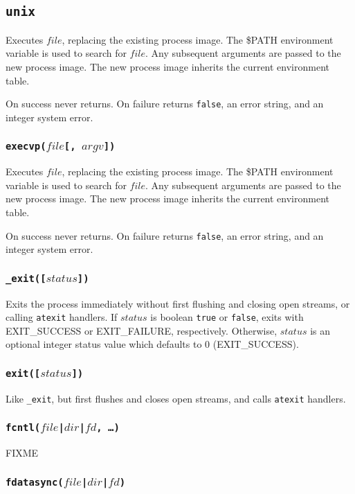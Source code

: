 \documentclass[11pt, oneside]{memoir}
\newcommand*{\true}[0]{\texttt{true}\xspace}
\newcommand*{\false}[0]{\texttt{false}\xspace}
\newcommand*{\syscall}[1]{\texttt{#1}\xspace}
\newcommand*{\fn}[1]{\texttt{#1}\xspace}
\newcounter{toccols}
\newenvironment{Module}[1]{
	\subsection{\texttt{#1}}
	\addtocontents{toc}{
		\protect\begin{multicols}{\value{toccols}}
	}
}{
	\addtocontents{toc}{\protect\end{multicols}}
}
\begin{document}
\begin{Module}{unix}
Executes $file$, replacing the existing process image. The \$PATH environment variable is used to search for $file$. Any subsequent arguments are passed to the new process image. The new process image inherits the current environment table.

On success never returns. On failure returns \false, an error string, and an integer system error.

\subsubsection[\fn{execvp}]{\fn{execvp($file$[, $argv$])}}

Executes $file$, replacing the existing process image. The \$PATH environment variable is used to search for $file$. Any subsequent arguments are passed to the new process image. The new process image inherits the current environment table.

On success never returns. On failure returns \false, an error string, and an integer system error.

\subsubsection[\fn{\_exit}]{\fn{\_exit([$status$])}}

Exits the process immediately without first flushing and closing open streams, or calling \syscall{atexit} handlers. If $status$ is boolean \true or \false, exits with EXIT\_SUCCESS or EXIT\_FAILURE, respectively. Otherwise, $status$ is an optional integer status value which defaults to 0 (EXIT\_SUCCESS).

\subsubsection[\fn{exit}]{\fn{exit([$status$])}}

Like \fn{\_exit}, but first flushes and closes open streams, and calls \syscall{atexit} handlers.

\subsubsection[\fn{fcntl}]{\fn{fcntl($file$|$dir$|$fd$, \ldots)}}

FIXME

\subsubsection[\fn{fdatasync}]{\fn{fdatasync($file$|$dir$|$fd$)}}


\end{Module}
\end{document}
